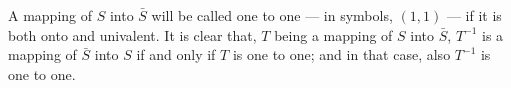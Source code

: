 A mapping of $S$ into $\bar{S}$ will be called one to one — in symbols, $(1, 1)$ — if it is both onto and univalent. It is clear that, $T$ being a mapping of $S$ into $\bar{S}$, $T^{-1}$ is a mapping of $\bar{S}$ into $S$ if and only if $T$ is one to one; and in that case, also $T^{-1}$ is one to one.
